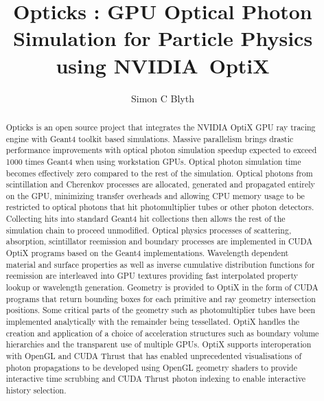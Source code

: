 \documentclass[a4paper]{jpconf}
\begin{document}
\title{Opticks : GPU Optical Photon Simulation for Particle Physics using NVIDIA\textregistered\ OptiX\texttrademark}

\author{Simon C Blyth}

\address{HEP Lab, Department of Physics, National Taiwan University, Taipei, Taiwan.}


\begin{abstract}
Opticks is an open source project that integrates the NVIDIA OptiX 
GPU ray tracing engine with Geant4 toolkit based simulations.
Massive parallelism brings drastic performance improvements with  
optical photon simulation speedup expected to exceed 1000 times Geant4 
when using workstation GPUs. Optical photon simulation time becomes 
effectively zero compared to the rest of the simulation.
Optical photons from scintillation and Cherenkov processes
are allocated, generated and propagated entirely on the GPU, minimizing 
transfer overheads and allowing CPU memory usage to be restricted to
optical photons that hit photomultiplier tubes or other photon detectors.
Collecting hits into standard Geant4 hit collections then allows the 
rest of the simulation chain to proceed unmodified.
Optical physics processes of scattering, absorption, scintillator reemission and 
boundary processes are implemented in CUDA OptiX programs based on the Geant4
implementations. Wavelength dependent material and surface properties as well as  
inverse cumulative distribution functions for reemission are interleaved into 
GPU textures providing fast interpolated property lookup or wavelength generation.
Geometry is provided to OptiX in the form of CUDA programs that return bounding boxes 
for each primitive and ray geometry intersection positions. Some critical parts 
of the geometry such as photomultiplier tubes have been implemented analytically 
with the remainder being tessellated. 
OptiX handles the creation and application of a choice of acceleration structures
such as boundary volume hierarchies and the transparent use of multiple GPUs. 
OptiX supports interoperation with OpenGL and CUDA Thrust that has enabled 
unprecedented visualisations of photon propagations to be developed 
using OpenGL geometry shaders to provide interactive time scrubbing and    
CUDA Thrust photon indexing to enable interactive history selection. 
\end{abstract}
\end{document}
